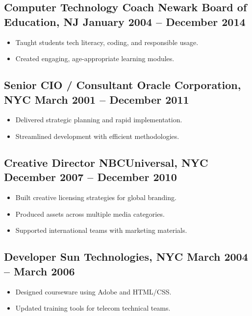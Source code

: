 \documentclass[a4paper,12pt]{article}
\begin{document}
\subsection*{Computer Technology Coach \hfill Newark Board of Education, NJ \newline January 2004 -- December 2014}
\begin{itemize}[leftmargin=1.5em]
    \item Taught students tech literacy, coding, and responsible usage.
    \item Created engaging, age-appropriate learning modules.
\end{itemize}

\subsection*{Senior CIO / Consultant \hfill Oracle Corporation, NYC \newline March 2001 -- December 2011}
\begin{itemize}[leftmargin=1.5em]
    \item Delivered strategic planning and rapid implementation.
    \item Streamlined development with efficient methodologies.
\end{itemize}

\subsection*{Creative Director \hfill NBCUniversal, NYC \newline December 2007 -- December 2010}
\begin{itemize}[leftmargin=1.5em]
    \item Built creative licensing strategies for global branding.
    \item Produced assets across multiple media categories.
    \item Supported international teams with marketing materials.
\end{itemize}

\subsection*{Developer \hfill Sun Technologies, NYC \newline March 2004 -- March 2006}
\begin{itemize}[leftmargin=1.5em]
    \item Designed courseware using Adobe and HTML/CSS.
    \item Updated training tools for telecom technical teams.
\end{itemize}
\end{document}
